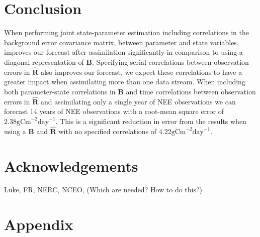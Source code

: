 \documentclass[11pt]{article}
\begin{document}
\section{Conclusion}

When performing joint state-parameter estimation including correlations in the background error covariance matrix, between parameter and state variables, improves our forecast after assimilation significantly in comparison to using a diagonal representation of $\textbf{B}$. Specifying serial correlations between observation errors in $\hat{\textbf{R}}$ also improves our forecast, we expect these correlations to have a greater impact when assimilating more than one data stream. 
When including both parameter-state correlations in $\textbf{B}$ and time correlations between observation errors in $\hat{\textbf{R}}$ and assimilating only a single year of NEE observations we can forecast 14 years of NEE observations with a root-mean square error of $2.38\text{gCm}^{-2}\text{day}^{-1}$. This is a significant reduction in error from the results when using a $\textbf{B}$ and $\hat{\textbf{R}}$ with no specified correlations of $4.22\text{gCm}^{-2}\text{day}^{-1}$.

\section{Acknowledgements}
Luke, FR, NERC, NCEO, (Which are needed? How to do this?)

{}
%

\section*{Appendix}
\end{document}
